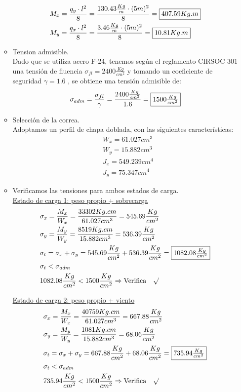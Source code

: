 \begin{enumerate}
\begin{itemize}
\begin{align*}
& M_x= \frac{q_y \cdot l^2}{8} = \frac{130.43 \frac{Kg}{m} \cdot (5m)^2}{8} = \framebox{$407.59 Kg.m$} \\
& M_y= \frac{q_x \cdot l^2}{8} = \frac{3.46 \frac{Kg}{m} \cdot (5m)^2}{8} = \framebox{$10.81 Kg.m$}
\end{align*}

\item Tension admisible.\\
Dado que se utiliza acero F-24, tenemos según el reglamento CIRSOC 301 una tensión de fluencia $\sigma_{fl}=2400 \frac{Kg}{cm^2}$ y tomando un coeficiente de seguridad $\gamma = 1.6$ , se obtiene una tensión admisible de:
$$\sigma_{adm}= \frac{\sigma_{fl}}{\gamma} = \frac{2400 \frac{Kg}{cm^2}}{1.6} = \framebox{$1500 \frac{Kg}{cm^2}$}$$

\newpage
\item Selección de la correa.\\
Adoptamos un perfil  de chapa doblada, con las siguientes características:
\begin{align*}
& W_x= 61.027 cm^3 \\
& W_y= 15.882 cm^3 \\
& J_x= 549.239 cm^4 \\
& J_y= 75.347 cm^4
\end{align*}

\item Verificamos las tensiones para ambos estados de carga.\\
\underline{Estado de carga 1: peso propio + sobrecarga}
\begin{align*}
& \sigma_x=\frac{M_x}{W_x} = \frac{33302 Kg.cm}{61.027 cm^3} = 545.69 \frac{Kg}{cm^2}\\
& \sigma_y=\frac{M_y}{W_y} = \frac{8519 Kg.cm}{15.882 cm^3} = 536.39 \frac{Kg}{cm^2}\\
& \sigma_t= \sigma_x + \sigma_y = 545.69 \frac{Kg}{cm^2} + 536.39 \frac{Kg}{cm^2} = \framebox{$1082.08 \frac{Kg}{cm^2}$}\\
& \sigma_t < \sigma_{adm}\\
& 1082.08 \frac{Kg}{cm^2} < 1500 \frac{Kg}{cm^2} \Rightarrow \text{Verifica} \quad \surd
\end{align*}

\underline{Estado de carga 2: peso propio + viento}
\begin{align*}
& \sigma_x=\frac{M_x}{W_x} = \frac{40759 Kg.cm}{61.027 cm^3} = 667.88 \frac{Kg}{cm^2}\\
& \sigma_y=\frac{M_y}{W_y} = \frac{1081 Kg.cm}{15.882 cm^3} = 68.06 \frac{Kg}{cm^2}\\
& \sigma_t= \sigma_x + \sigma_y = 667.88 \frac{Kg}{cm^2} + 68.06 \frac{Kg}{cm^2} = \framebox{$735.94 \frac{Kg}{cm^2}$}\\
& \sigma_t < \sigma_{adm}\\
& 735.94 \frac{Kg}{cm^2} < 1500 \frac{Kg}{cm^2} \Rightarrow \text{Verifica} \quad \surd
\end{align*}


\end{itemize}
\end{enumerate}
